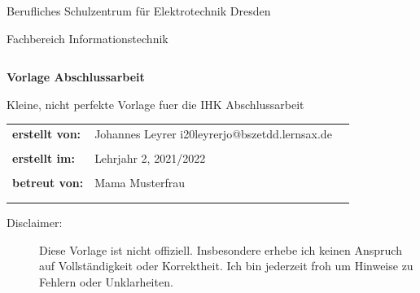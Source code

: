 \documentclass[a4paper,
    11pt,
    headings=small,
    ngerman,
    listof=totoc,
    index=totoc,
    numbers=noenddot]{scrreprt}[2021/11/13]
\begin{document}
\pagestyle{empty}


\begin{center}
  \Large{Berufliches Schulzentrum für Elektrotechnik Dresden}\\
\end{center}

\begin{center}
  \Large{Fachbereich Informationstechnik}
\end{center}
\begin{verbatim}

\end{verbatim}
\begin{center}
  \textbf{\LARGE{Vorlage Abschlussarbeit}}
\end{center}

\begin{center}
  \Large{Kleine, nicht perfekte Vorlage fuer die IHK Abschlussarbeit}
\end{center}

\vspace{\fill}
\begin{flushleft}
  \begin{tabular}{lll}
    \textbf{erstellt von:} & Johannes Leyrer \flq{}i20leyrerjo@bszetdd.lernsax.de\frq{}   \\
                           &                                                            & \\
    \textbf{erstellt im:}  & Lehrjahr 2, 2021/2022                                        \\
                           &                                                            & \\
    \textbf{betreut von: } & Mama Musterfrau                                              \\
                           &                                                            & \\
                           &                                                            & \\
  \end{tabular}
\end{flushleft}

\begin{description}
  \item[Disclaimer:] Diese Vorlage ist nicht offiziell. Insbesondere erhebe ich keinen Anspruch auf Vollständigkeit oder Korrektheit. Ich bin jederzeit froh um Hinweise zu Fehlern oder Unklarheiten.
\end{description}
\end{document}
